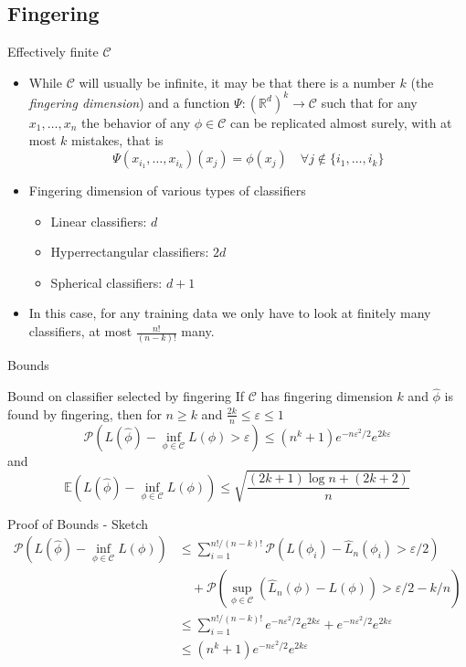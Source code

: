 \documentclass{beamer}
\renewcommand{\Pr}[1]{\mathcal{P} \left( #1 \right)}
\newcommand{\cls}{\mathcal{C}}
\newcommand{\E}[1]{\mathbb{E}\left( #1 \right)}
\newcommand{\R}{\mathbb{R}}
\newcommand{\pa}[1]{\left( #1 \right)}
\newcommand{\eps}{\varepsilon}
\begin{document}
\subsection{Fingering}
\begin{frame}{Effectively finite $\cls$}
\begin{itemize}
\item While $\cls$ will usually be infinite, it may be that there is a number $k$ (the \emph{fingering dimension}) and a function $\Psi: (\R^d)^k \to \cls$ such that for any $x_1,\ldots,x_n$ the behavior of any $\phi \in \cls$ can be replicated almost surely, with at most $k$ mistakes, that is
\[ \Psi(x_{i_1}, \ldots, x_{i_k})(x_j) = \phi(x_j) \quad \forall j \not\in \{i_1,\ldots,i_k\} \]
\item Fingering dimension of various types of classifiers
\begin{itemize}
\item Linear classifiers: $d$
\item Hyperrectangular classifiers: $2d$
\item Spherical classifiers: $d+1$
\end{itemize}
\item In this case, for any training data we only have to look at finitely many classifiers, at most $\frac{n!}{(n-k)!}$ many.
\end{itemize}
\end{frame}

\begin{frame}{Bounds}
\begin{block}{Bound on classifier selected by fingering}
If $\cls$ has fingering dimension $k$ and $\hat\phi$ is found by fingering, then for $n \geq k$ and $\frac{2k}n \leq \eps \leq 1$
\[ \Pr{ L(\hat\phi) - \inf_{\phi \in \cls} L(\phi) > \eps} \leq (n^k + 1)e^{-n\eps^2/2} e^{2k\eps} \]
and
\[ \E{ L(\hat\phi) - \inf_{\phi \in \cls} L(\phi)} \leq \sqrt{\frac{(2k+1)\log n + (2k+2)}n}\]
\end{block}
\end{frame}

\begin{frame}{Proof of Bounds - Sketch}
\begin{align*}
\Pr{ L(\hat\phi) - \inf_{\phi\in\cls} L(\phi)} & \leq \sum_{i=1}^{n!/(n-k)!} \Pr{L(\phi_i) - \hat{L}_n(\phi_i) > \eps/2} \\
	& \quad + \Pr{ \sup_{\phi\in \cls} \pa{ \hat{L}_n(\phi) - L(\phi) } > \eps/2 - k/n } \\
	& \leq \sum_{i=1}^{n!/(n-k)!} e^{-n\eps^2/2} e^{2k\eps} + e^{-n\eps^2/2} e^{2k\eps}\\
	& \leq (n^k +1)e^{-n\eps^2/2} e^{2k\eps}
\end{align*}

\end{frame}
\end{document}
